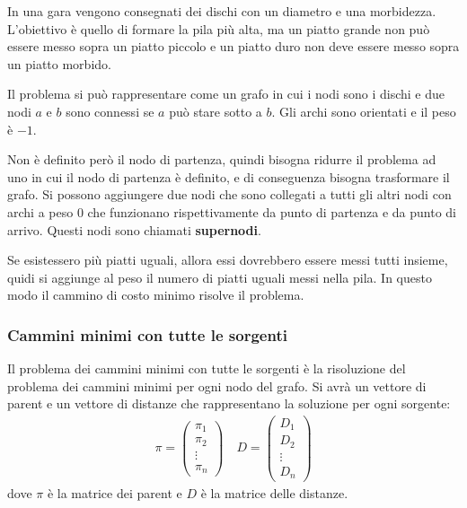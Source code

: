 \documentclass[a4paper]{article}
\begin{document}
\begin{exercise}
  In una gara vengono consegnati dei dischi con un diametro e una morbidezza.
  L'obiettivo è quello di formare la pila più alta, ma un piatto grande non può essere
  messo sopra un piatto piccolo e un piatto duro non deve essere messo sopra un piatto
  morbido.

  \vspace{1em}
  \noindent
  Il problema si può rappresentare come un grafo in cui i nodi sono i dischi e due
  nodi \( a \) e \( b \) sono connessi se \( a \) può stare sotto a \( b \). Gli
  archi sono orientati e il peso è \( -1 \).

  \vspace{1em}
  \noindent
  Non è definito però il nodo di partenza, quindi bisogna ridurre il problema ad uno
  in cui il nodo di partenza è definito, e di conseguenza bisogna trasformare il grafo.
  Si possono aggiungere due nodi che sono collegati a tutti gli altri nodi con archi
  a peso 0 che funzionano rispettivamente da punto di partenza e da punto di arrivo.
  Questi nodi sono chiamati \textbf{supernodi}.

  \vspace{1em}
  \noindent
  Se esistessero più piatti uguali, allora essi dovrebbero essere messi tutti insieme,
  quidi si aggiunge al peso il numero di piatti uguali messi nella pila. In questo
  modo il cammino di costo minimo risolve il problema.
\end{exercise}

\subsubsection{Cammini minimi con tutte le sorgenti}
Il problema dei cammini minimi con tutte le sorgenti è la risoluzione del problema
dei cammini minimi per ogni nodo del grafo. Si avrà un vettore di parent e un vettore
di distanze che rappresentano la soluzione per ogni sorgente:
\[
  \begin{aligned}
    \pi = \begin{pmatrix} 
      \pi_1\\
      \pi_2\\
      \vdots\\
      \pi_n
    \end{pmatrix} 
    \quad
    D = \begin{pmatrix} 
      D_1\\
      D_2\\
      \vdots\\
      D_n
    \end{pmatrix}
  \end{aligned}
\] 
dove \( \pi \) è la matrice dei parent e \( D \) è la matrice delle distanze.
\end{document}
